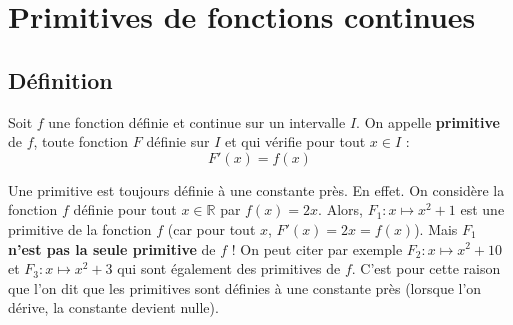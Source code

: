 


	
	
	

	\section{Primitives de fonctions continues}

	\subsection{Définition}

	\begin{formula}[Définition]
		Soit $f$ une fonction définie et continue sur un intervalle $I$. On appelle \textbf{primitive} de $f$, toute fonction $F$ définie sur $I$ et qui vérifie pour tout $x \in I$ :
		\[ F'(x) = f(x) \]
	\end{formula}

	\begin{tip}[Note]
		Une primitive est toujours définie à une constante près.
		\newpar
		En effet. On considère la fonction $f$ définie pour tout $x \in \mathbb{R}$ par $f(x) = 2x$. Alors, $F_{1} : x \mapsto x^2 + 1$ est une primitive de la fonction $f$ (car pour tout $x$, $F'(x) = 2x = f(x)$).
		\newpar
		Mais $F_{1}$ \textbf{n'est pas la seule primitive} de $f$ ! On peut citer par exemple $F_{2} : x \mapsto x^2 + 10$ et $F_{3} : x \mapsto x^2 + 3$ qui sont également des primitives de $f$.
		\newpar
		C'est pour cette raison que l'on dit que les primitives sont définies à une constante près (lorsque l'on dérive, la constante devient nulle).
	\end{tip}

